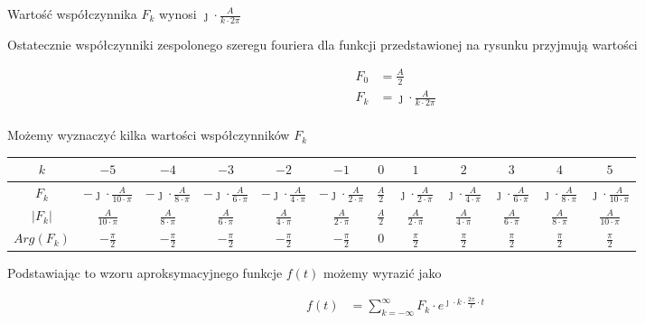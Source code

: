 \begin{task}
Wartość współczynnika $F_k$ wynosi $\jmath \cdot \frac{A}{k\cdot 2\pi}$

Ostatecznie współczynniki zespolonego szeregu fouriera dla funkcji przedstawionej na rysunku przyjmują wartości

\begin{align*}
F_0&=\frac{A}{2}\\
F_k&=\jmath \cdot \frac{A}{k\cdot 2\pi}\\
\end{align*}

Możemy wyznaczyć kilka wartości współczynników $F_k$

\begin{table}[H]
  \centering  
  \begin{tabular}{|c|c|c|c|c|c|c|c|c|c|c|c|}
    \hline 
    $k$ & $-5$ & $-4$ & $-3$ & $-2$ & $-1$ & $0$ & $1$ & $2$ & $3$ & $4$ & $5$\\ 
    \hline 
    $F_k$ & $-\jmath\cdot \frac{A}{10\cdot \pi}$ & $-\jmath\cdot \frac{A}{8\cdot \pi}$ & $-\jmath\cdot \frac{A}{6\cdot \pi}$ & $-\jmath\cdot \frac{A}{4\cdot \pi}$ & $-\jmath\cdot \frac{A}{2\cdot \pi}$ & $\frac{A}{2}$ & $\jmath\cdot \frac{A}{2\cdot \pi}$ & $\jmath\cdot \frac{A}{4\cdot \pi}$ & $\jmath\cdot \frac{A}{6\cdot \pi}$ & $\jmath\cdot \frac{A}{8\cdot \pi}$ & $\jmath\cdot \frac{A}{10\cdot \pi}$\\ 
    \hline 
    $\left|F_k\right|$ & $\frac{A}{10\cdot \pi}$ & $\frac{A}{8\cdot \pi}$ & $\frac{A}{6\cdot \pi}$ & $\frac{A}{4\cdot \pi}$ & $\frac{A}{2\cdot \pi}$ & $\frac{A}{2}$ & $\frac{A}{2\cdot \pi}$ & $\frac{A}{4\cdot \pi}$ & $\frac{A}{6\cdot \pi}$ & $\frac{A}{8\cdot \pi}$ & $\frac{A}{10\cdot \pi}$\\ 
    \hline 
    $Arg\left(F_k\right)$ & $-\frac{\pi}{2}$ & $-\frac{\pi}{2}$ & $-\frac{\pi}{2}$ & $-\frac{\pi}{2}$ & $-\frac{\pi}{2}$ & $0$ & $\frac{\pi}{2}$ & $\frac{\pi}{2}$ & $\frac{\pi}{2}$ & $\frac{\pi}{2}$ & $\frac{\pi}{2}$\\ 
    \hline 
  \end{tabular} 
\end{table}

Podstawiając to wzoru aproksymacyjnego funkcje $f(t)$ możemy wyrazić jako

\begin{equation}
\begin{aligned}
f(t) &= \sum_{k=-\infty}^{\infty} F_k \cdot e^{\jmath \cdot k \cdot \frac{2\pi}{T} \cdot t}
\end{aligned}
\end{equation}


\end{task}
